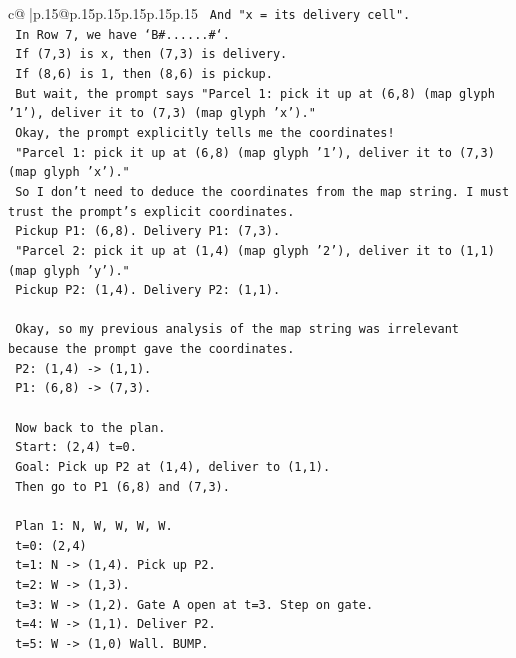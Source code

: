 \documentclass{article}
\begin{document}
{\begin{supertabular}{c@{$\;$}|p{.15\linewidth}@{}p{.15\linewidth}p{.15\linewidth}p{.15\linewidth}p{.15\linewidth}p{.15\linewidth}}
{{{\texttt{   And "x = its delivery cell".} \\
\texttt{   In Row 7, we have `B\#......\#`.} \\
\texttt{   If (7,3) is x, then (7,3) is delivery.} \\
\texttt{   If (8,6) is 1, then (8,6) is pickup.} \\
\texttt{   But wait, the prompt says "Parcel 1: pick it up at (6,8) (map glyph '1'), deliver it to (7,3) (map glyph 'x')."} \\
\texttt{   Okay, the prompt explicitly tells me the coordinates!} \\
\texttt{   "Parcel 1: pick it up at (6,8) (map glyph '1'), deliver it to (7,3) (map glyph 'x')."} \\
\texttt{   So I don't need to deduce the coordinates from the map string. I must trust the prompt's explicit coordinates.} \\
\texttt{   Pickup P1: (6,8). Delivery P1: (7,3).} \\
\texttt{   "Parcel 2: pick it up at (1,4) (map glyph '2'), deliver it to (1,1) (map glyph 'y')."} \\
\texttt{   Pickup P2: (1,4). Delivery P2: (1,1).} \\
\\ 
\texttt{   Okay, so my previous analysis of the map string was irrelevant because the prompt gave the coordinates.} \\
\texttt{   P2: (1,4) {-}> (1,1).} \\
\texttt{   P1: (6,8) {-}> (7,3).} \\
\\ 
\texttt{   Now back to the plan.} \\
\texttt{   Start: (2,4) t=0.} \\
\texttt{   Goal: Pick up P2 at (1,4), deliver to (1,1).} \\
\texttt{   Then go to P1 (6,8) and (7,3).} \\
\\ 
\texttt{   Plan 1: N, W, W, W, W.} \\
\texttt{   t=0: (2,4)} \\
\texttt{   t=1: N {-}> (1,4). Pick up P2.} \\
\texttt{   t=2: W {-}> (1,3).} \\
\texttt{   t=3: W {-}> (1,2). Gate A open at t=3. Step on gate.} \\
\texttt{   t=4: W {-}> (1,1). Deliver P2.} \\
\texttt{   t=5: W {-}> (1,0) Wall. BUMP.} \\
}}}
\end{supertabular}}
\end{document}
